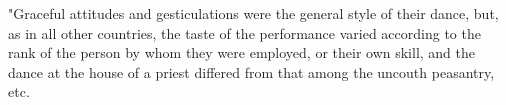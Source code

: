
"Graceful attitudes and gesticulations were the general style of their dance, but, as in all other countries, the taste of the performance varied according to the rank of the person by whom they were employed, or their own skill, and the dance at the house of a priest differed from that among the uncouth peasantry, etc.

